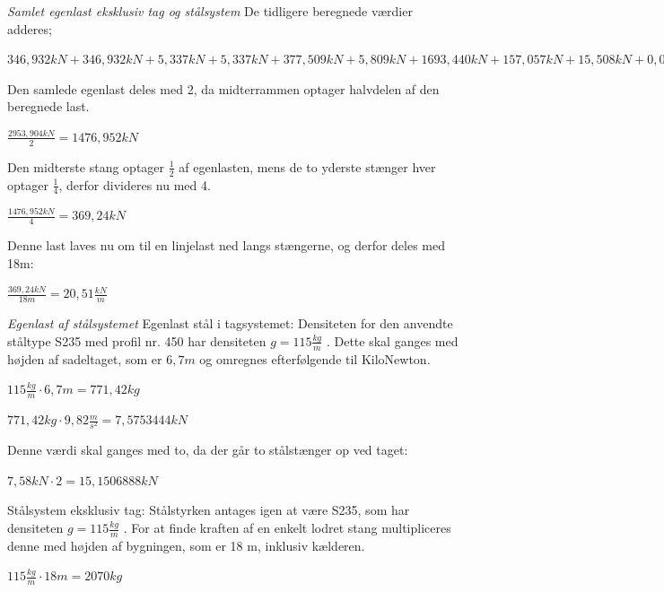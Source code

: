 \textit{Samlet egenlast eksklusiv tag og stålsystem}
\newline
De tidligere beregnede værdier adderes; 
\begin{center}
	$346,\!932 kN + 346,\!932 kN + 5,\!337 kN + 5,\!337 kN + 377,\!509 kN + 5,\!809 kN + 1693,\!440 kN + 157,\!057 kN + 15,\!508 kN + 0,\!043 kN = 2953,\!904 kN$
\end{center}
Den samlede egenlast deles med 2, da midterrammen optager halvdelen af den beregnede last. 
\begin{center}
	$\frac{2953,904 kN}{2} =  1476,\!952 kN$
\end{center}
Den midterste stang optager $\frac{1}{2}$ af egenlasten, mens de to yderste stænger hver optager $\frac{1}{4}$, derfor divideres nu med 4.

\begin{center}
	$\frac{1476,952 kN}{4} =  369,\!24 kN$
\end{center}

Denne last laves nu om til en linjelast ned langs stængerne, og derfor deles med 18m:
 
\begin{center}
	$\frac{369,24 kN}{18m} =  20,\!51 \frac{kN}{m}$
\end{center} 

\textit{Egenlast af stålsystemet}
\newline
Egenlast stål i tagsystemet:
\newline
Densiteten for den anvendte ståltype S235 med profil nr. 450 har densiteten $g=115\frac{kg}{m}$ \citep{Stabi}. Dette skal ganges med højden af sadeltaget, som er $6,\!7m$ og omregnes efterfølgende til KiloNewton.  
\begin{center}
	$115\frac{kg}{m}\cdot 6,\!7m = 771,\! 42 kg$
\end{center}

\begin{center}
	$771,\! 42kg\cdot 9,\! 82\frac{m}{s^2} = 7,\! 5753444 kN$
\end{center}

Denne værdi skal ganges med to, da der går to stålstænger op ved taget:

\begin{center}
$7,\! 58kN \cdot 2 = 15,\! 1506888 kN$
\end{center}

Stålsystem eksklusiv tag:
\newline
Stålstyrken antages igen at være S235, som har densiteten $g=115\frac{kg}{m}$ \citep{Stabi}. For at finde kraften af en enkelt lodret stang multipliceres denne med højden af bygningen, som er 18 m, inklusiv kælderen.
\begin{center}
	$115\frac{kg}{m}\cdot 18m = 2070 kg$
\end{center}

